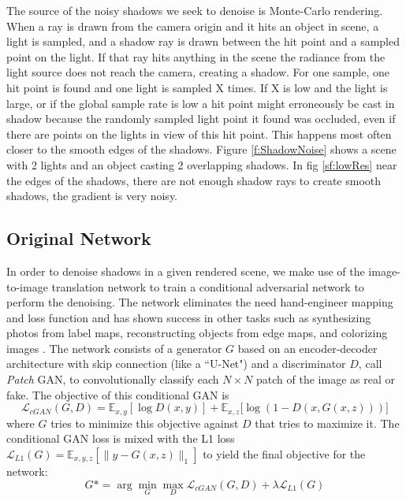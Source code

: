\documentclass[acmsmall]{acmart}
\begin{document}
The source of the noisy shadows we seek to denoise is Monte-Carlo rendering. When a ray is drawn from the camera origin and it hits an object in scene, a light is sampled, and a shadow ray is drawn between the hit point and a sampled point on the light. If that ray hits anything in the scene the radiance from the light source does not reach the camera, creating a shadow. For one sample, one hit point is found and one light is sampled X times. If X is low and the light is large, or if the global sample rate is low a hit point might erroneously be cast in shadow because the randomly sampled light point it found was occluded, even if there are points on the lights in view of this hit point. This happens most often closer to the smooth edges of the shadows. Figure \ref{f:ShadowNoise} shows a scene with 2 lights and an object casting 2 overlapping shadows. In fig \ref{sf:lowRes} near the edges of the shadows, there are not enough shadow rays to create smooth shadows, the gradient is very noisy.

\subsection{Original Network}

In order to denoise shadows in a given rendered scene, we make use of the image-to-image translation network to train a conditional adversarial network to perform the denoising. The network eliminates the need hand-engineer mapping and loss function and has shown success in other tasks such as synthesizing photos from label maps, reconstructing objects from edge maps, and colorizing images \cite{DBLP:journals/corr/IsolaZZE16}. The network consists of a generator $G$ based on an encoder-decoder architecture with skip connection (like a ``U-Net") and a discriminator $D$, call \textit{Patch} GAN, to convolutionally classify each $N \times N$ patch of the image as real or fake. The objective of this conditional GAN  is \begin{equation}
    \mathcal{L}_{cGAN}(G,D) = \mathbb{E}_{x,y}[\log{D(x,y)}] + \mathbb{E}_{x,z}[\log{(1 - D(x,G(x,z)))]}
\end{equation} 
where $G$ tries to minimize this objective against $D$ that tries to maximize it. The conditional GAN loss is mixed with the L1 loss $\mathcal{L}_{L1}(G) = \mathbb{E}_{x,y,z} [ \| y - G(x,z) \|_1]$ to yield the final objective for the network: \begin{equation}
    G* = \arg \min_G \max_D \mathcal{L}_{cGAN}(G,D) + \lambda \mathcal{L}_{L1}(G)
\end{equation}
\end{document}
